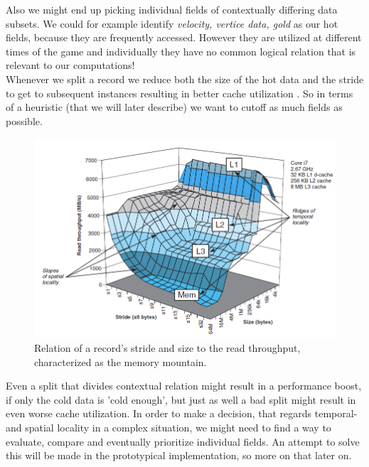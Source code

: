 Also we might end up picking individual fields of contextually differing data subsets. We could for example identify \textit{velocity, vertice data, gold} as our hot fields, because they are frequently accessed. However they are utilized at different times of the game and individually they have no common logical relation that is relevant to our computations!\\
Whenever we split a record we reduce both the size of the hot data and the stride to get to subsequent instances resulting in better cache utilization . So in terms of a heuristic (that we will later describe) we want to cutoff as much fields as possible.
\begin{figure}[!htbp]
	\centering
	\includegraphics[width=\textwidth, height=0.5\textwidth]{PICs/memory_mountain}
	\caption{Relation of a record's stride and size to the read throughput, characterized as the memory mountain. }\label{memory_mountain}
\end{figure}
Even a split that divides contextual relation might result in a performance boost, if only the cold data is 'cold enough', but just as well a bad split might result in even worse cache utilization.
In order to make a decision, that regards temporal- and spatial locality in a complex situation, we might need to find a way to evaluate, compare and eventually prioritize individual fields. An attempt to solve this will be made in the prototypical implementation, so more on that later on.\\

